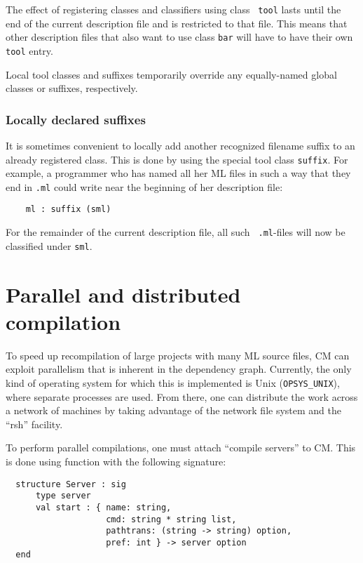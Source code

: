 \documentclass[titlepage,letterpaper]{article}
\begin{document}
The effect of registering classes and classifiers using class {\tt
tool} lasts until the end of the current description file and is
restricted to that file.  This means that other description files that
also want to use class {\tt bar} will have to have their own {\tt
tool} entry.

Local tool classes and suffixes temporarily override any equally-named
global classes or suffixes, respectively.

\subsubsection{Locally declared suffixes}
\label{sec:localsuffixes}

It is sometimes convenient to locally add another recognized filename
suffix to an already registered class.  This is done by using the
special tool class {\tt suffix}.  For example, a programmer who has
named all her ML files in such a way that they end in {\tt .ml}
could write near the beginning of her description file:

\begin{verbatim}
    ml : suffix (sml)
\end{verbatim}

For the remainder of the current description file, all such {\tt
.ml}-files will now be classified under {\tt sml}.

\section{Parallel and distributed compilation}
\label{sec:parmake}

To speed up recompilation of large projects with many ML source files,
CM can exploit parallelism that is inherent in the dependency graph.
Currently, the only kind of operating system for which this is
implemented is Unix ({\tt OPSYS\_UNIX}), where separate processes are
used.  From there, one can distribute the work across a network of
machines by taking advantage of the network file system and the
``rsh'' facility.

To perform parallel compilations, one must attach ``compile servers''
to CM.  This is done using function
with the following signature:

\begin{verbatim}
  structure Server : sig
      type server
      val start : { name: string,
                    cmd: string * string list,
                    pathtrans: (string -> string) option,
                    pref: int } -> server option
  end
\end{verbatim}
\end{document}
